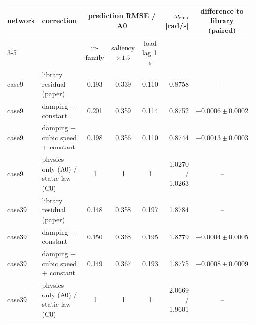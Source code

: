 \begin{tabular}{llcccrc}
\toprule
network & correction & \multicolumn{3}{c}{prediction RMSE / A0} & $\omega_{\rm rms}$ [rad/s] & difference to library (paired)\\
\cmidrule(lr){3-5}
 & & in-family & saliency $\times1.5$ & load lag 1\,s & & \\
\midrule
case9 & library residual (paper) & 0.193 & 0.339 & 0.110 & 0.8758 & -- \\
case9 & damping + constant & 0.201 & 0.359 & 0.114 & 0.8752 & $-0.0006\pm0.0002$ \\
case9 & damping + cubic speed + constant & 0.198 & 0.356 & 0.110 & 0.8744 & $-0.0013\pm0.0003$ \\
case9 & physics only (A0) / static law (C0) & 1 & 1 & 1 & 1.0270 / 1.0263 & -- \\
\midrule
case39 & library residual (paper) & 0.148 & 0.358 & 0.197 & 1.8784 & -- \\
case39 & damping + constant & 0.150 & 0.368 & 0.195 & 1.8779 & $-0.0004\pm0.0005$ \\
case39 & damping + cubic speed + constant & 0.149 & 0.367 & 0.193 & 1.8775 & $-0.0008\pm0.0009$ \\
case39 & physics only (A0) / static law (C0) & 1 & 1 & 1 & 2.0669 / 1.9601 & -- \\
\bottomrule
\end{tabular}
